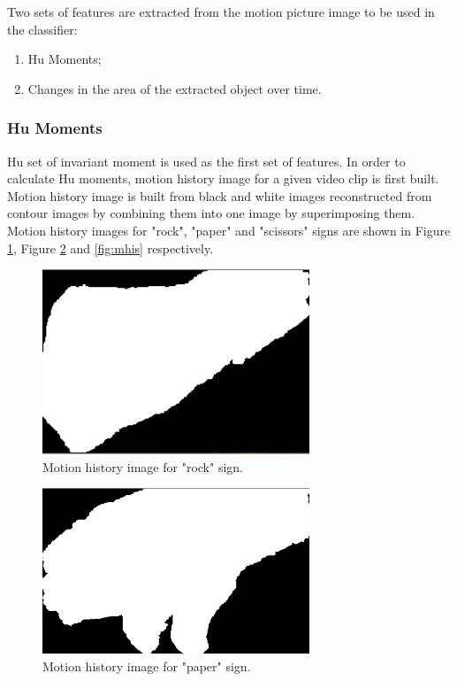 Two sets of features are extracted from the motion picture image to be used in the classifier:

\begin{enumerate}
\item Hu Moments;
\item Changes in the area of the extracted object over time.
\end{enumerate}

\subsubsection*{Hu Moments}

Hu set of invariant moment is used as the first set of features. In order to calculate Hu moments, motion history image for a given video clip is first built. Motion history image is built from black and white images reconstructed from contour images by combining them into one image by superimposing them. Motion history images for "rock", "paper" and "scissors" signs are shown in Figure \ref{fig:mhir}, Figure \ref{fig:mhip} and \ref{fig:mhis} respectively. 

\begin{figure}
\begin{center}
\includegraphics[width=80mm]{mhi_rock.png}
\caption{Motion history image for "rock" sign.}
\label{fig:mhir}
\end{center}
\end{figure}

\begin{figure}
\begin{center}
\includegraphics[width=80mm]{mhi_paper.png}
\caption{Motion history image for "paper" sign.}
\label{fig:mhip}
\end{center}
\end{figure}

